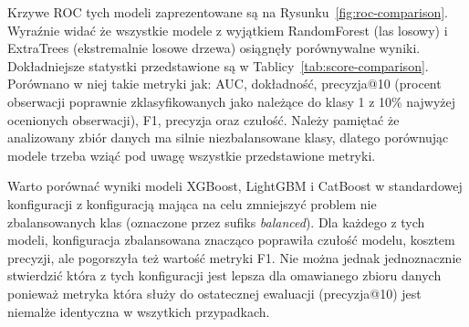 \documentclass[a4paper,12pt]{article}
\begin{document}
    Krzywe ROC tych modeli zaprezentowane są na Rysunku~\ref{fig:roc-comparison}.
    Wyraźnie widać że wszystkie modele z wyjątkiem RandomForest (las losowy) i ExtraTrees (ekstremalnie losowe drzewa) osiągnęły porównywalne wyniki.
    Dokładniejsze statystki przedstawione są w Tablicy~\ref{tab:score-comparison}.
    Porównano w niej takie metryki jak: AUC, dokładność, precyzja@10 (procent obserwacji poprawnie zklasyfikowanych jako należące do klasy 1 z 10\% najwyżej ocenionych obserwacji), F1, precyzja oraz czułość.
    Należy pamiętać że analizowany zbiór danych ma silnie niezbalansowane klasy, dlatego porównując modele trzeba wziąć pod uwagę wszystkie przedstawione metryki.

    Warto porównać wyniki modeli XGBoost, LightGBM i CatBoost w standardowej konfiguracji z konfiguracją mająca na celu zmniejszyć problem nie zbalansowanych klas (oznaczone przez sufiks \textit{balanced}).
    Dla każdego z tych modeli, konfiguracja zbalansowana znacząco poprawiła czułość modelu, kosztem precyzji, ale pogorszyła też wartość metryki F1.
    Nie można jednak jednoznacznie stwierdzić która z tych konfiguracji jest lepsza dla omawianego zbioru danych ponieważ metryka która służy do ostatecznej ewaluacji (precyzja@10) jest niemalże identyczna w wszytkich przypadkach.
\end{document}
